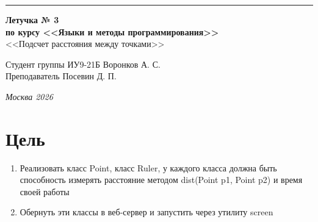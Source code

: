 \documentclass[a4paper, 14pt]{extarticle}
\begin{document}
\begin{titlepage}
\vspace*{-16pt}
\hspace{30pt}\rule{0.866\textwidth}{0.4pt}
  
\vspace{11em}

\begin{center}
\Large {\bf Летучка № 3} \\ 
\large {\bf по курсу <<Языки и методы программирования>>} \\ 
\large <<Подсчет расстояния между точками>>
\end{center}\normalsize

\vspace{8em}


\begin{flushright}
  {Студент группы ИУ9-21Б Воронков А. С.\hspace*{15pt} \\
  \vspace{2ex}
  Преподаватель Посевин Д. П.\hspace*{15pt}}
\end{flushright}

\bigskip

\vfill
 

\begin{center}
\textsl{Москва 2026}
\end{center}
\end{titlepage}

\renewcommand{\ttdefault}{pcr}

\setlength{\tabcolsep}{3pt}
\newpage
\setcounter{page}{2}

\section{Цель}\label{Sect::task}
\par 
\begin{enumerate}
    \item Реализовать класс Point, класс Ruler, у каждого класса должна быть способность измерять расстояние методом dist(Point p1, Point p2) и время своей работы 
    \item Обернуть эти классы в веб-сервер и запустить через утилиту screen
\end{enumerate}
\pagebreak
\end{document}
